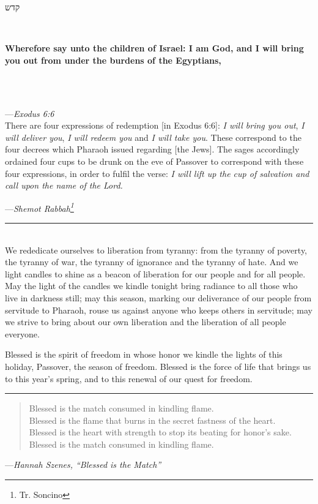 \documentclass[a4paper,10pt,openany]{memoir}
\newcommand{\HgInst}[1]{{\noindent\sffamily{\bfseries{#1}}}}
\newcommand{\HgSource}[1]{\hfill{\small---\itshape{#1}}}
\newcommand{\hchapter}[1]{
  \begin{hebrew}
    \begin{Spacing}{.97}
      \newpage
      \strut

      \vspace{.15em}

      \noindent\Huge #1

      \vspace{1em}
    \end{Spacing}
  \end{hebrew}
}
\newcommand{\HgHL}[1]{{\Large\textbf{#1}\par\noindent\\[-.5em]}}
\newcommand{\HgFill}{\vfill \hrule \vfill}
\newenvironment{HgEnglish}{\strut\\\noindent}{\vspace{1em}}
\newcommand{\JSrc}{\textsuperscript{\upshape{[J]}}}
\newcommand{\SSrc}{\textsuperscript{\upshape{[S]}}}
\begin{document}
\HgInst{Drink the first cup.}

\vfill

\hchapter{קדש}

\begin{HgEnglish}
  \HgHL{
  Wherefore say unto the children of Israel: I am God, and I will bring you out
  from under the burdens of the Egyptians,}\\[-3em]

  \HgSource{Exodus 6:6 \JSrc}\\

  \noindent There are four expressions of redemption [in Exodus 6:6]: {\itshape
  I will bring you out}, {\itshape I will deliver you}, {\itshape I will redeem
  you} and {\itshape I will take you}. These correspond to the four decrees
  which Pharaoh issued regarding [the Jews]. The sages accordingly ordained four
  cups to be drunk on the eve of Passover to correspond with these four
  expressions, in order to fulfil the verse: {\itshape I will lift up the cup of
  salvation and call upon the name of the Lord.}

  \HgSource{Shemot Rabbah\footnote{Tr. Soncino}}
\end{HgEnglish}

\HgFill

\begin{HgEnglish}
  [{\itshape On Shabbat:}]
  We rededicate ourselves to liberation from tyranny: from the tyranny of
  poverty, the tyranny of war, the tyranny of ignorance and the tyranny of hate.
  And we light candles to shine as a beacon of liberation for our people and for
  all people. May the light of the candles we kindle tonight bring radiance to
  all those who live in darkness still; may this season, marking our deliverance
  of our people from servitude to Pharaoh, rouse us against anyone who keeps
  others in servitude; may we strive to bring about our own liberation and the
  liberation of all people everyone.

  Blessed is the spirit of freedom in whose honor we kindle the lights of this
  holiday, Passover, the season of freedom. Blessed is the force of life that
  brings us to this year’s spring, and to this renewal of our quest for freedom.
  \SSrc
\end{HgEnglish}

\HgFill

\begin{verse}
  Blessed is the match consumed in kindling flame. \\
  Blessed is the flame that burns in the secret fastness of the heart. \\
  Blessed is the heart with strength to stop its beating for honor's sake. \\
  Blessed is the match consumed in kindling flame.
\end{verse}
\HgSource{Hannah Szenes, ``Blessed is the Match''}
\end{document}
